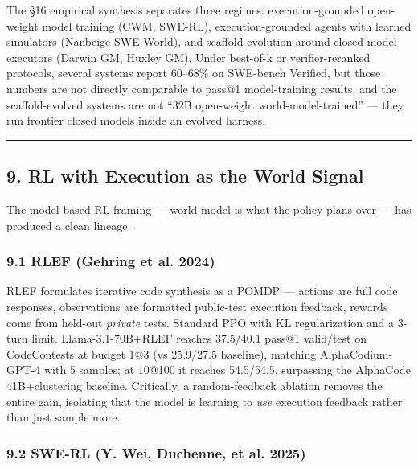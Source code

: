 \documentclass{article}
\begin{document}
The §16 empirical synthesis separates three regimes: execution-grounded
open-weight model training (CWM, SWE-RL), execution-grounded agents with
learned simulators (Nanbeige SWE-World), and scaffold evolution around
closed-model executors (Darwin GM, Huxley GM). Under best-of-k or
verifier-reranked protocols, several systems report 60--68\% on
SWE-bench Verified, but those numbers are not directly comparable to
pass@1 model-training results, and the scaffold-evolved systems are not
``32B open-weight world-model-trained'' --- they run frontier closed
models inside an evolved harness.

\begin{center}\rule{0.5\linewidth}{0.5pt}\end{center}

\hypertarget{rl-with-execution-as-the-world-signal}{%
\subsection{9. RL with Execution as the World
Signal}\label{rl-with-execution-as-the-world-signal}}

The model-based-RL framing --- world model is what the policy plans over
--- has produced a clean lineage.

\hypertarget{rlef-arxiv2410_02089}{%
\subsubsection{9.1 RLEF (Gehring et al.
2024)}\label{rlef-arxiv2410_02089}}

RLEF formulates iterative code synthesis as a POMDP --- actions are full
code responses, observations are formatted public-test execution
feedback, rewards come from held-out \emph{private} tests. Standard PPO
with KL regularization and a 3-turn limit. Llama-3.1-70B+RLEF reaches
37.5/40.1 pass@1 valid/test on CodeContests at budget 1@3 (vs 25.9/27.5
baseline), matching AlphaCodium-GPT-4 with 5 samples; at 10@100 it
reaches 54.5/54.5, surpassing the AlphaCode 41B+clustering baseline.
Critically, a random-feedback ablation removes the entire gain,
isolating that the model is learning to \emph{use} execution feedback
rather than just sample more.

\hypertarget{swe-rl-arxiv2502_18449}{%
\subsubsection{9.2 SWE-RL (Y. Wei, Duchenne, et al.
2025)}\label{swe-rl-arxiv2502_18449}}
\end{document}

